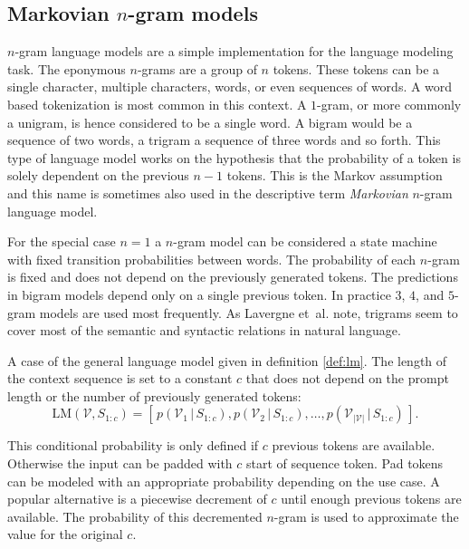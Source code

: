     \subsection{Markovian $n$-gram models}
    $n$-gram language models are a simple implementation for the language modeling task.
    The eponymous $n$-grams are a group of $n$ tokens.
    These tokens can be a single character, multiple characters, words, or even sequences of words.
    A word based tokenization is most common in this context.
    A $1$-gram, or more commonly a unigram, is hence considered to be a single word.
    A bigram would be a sequence of two words, a trigram a sequence of three words and so forth.
    This type of language model works on the hypothesis that the probability of a token is solely dependent on the previous $n-1$ tokens.
    This is the Markov assumption and this name is sometimes also used in the descriptive term \emph{Markovian} $n$-gram language model. 

    For the special case $n=1$ a $n$-gram model can be considered a state machine with fixed transition probabilities between words.
    The probability of each $n$-gram is fixed and does not depend on the previously generated tokens.
    The predictions in bigram models depend only on a single previous token.
    In practice $3$, $4$, and $5$-gram models are used most frequently.
    As Lavergne et~al. \cite{lavergne2008detecting} note, trigrams seem to cover most of the semantic and syntactic relations in natural language.

    \begin{definition}
    \label{def:markovLM}
        A case of the general language model given in definition \ref{def:lm}.
        The length of the context sequence is set to a constant $c$ that does not depend on the prompt length or the number of previously generated tokens:
        \begin{equation}
            \mathrm{LM}(\mathcal{V}, S_{1:c}) = \left[ \, p(\mathcal{V}_1 \, | \, S_{1:c}), p(\mathcal{V}_2 \, | \, S_{1:c}), \dots,  p(\mathcal{V}_{|\mathcal{V}|} \, | \, S_{1:c}) \,  \right] \text{.}
        \end{equation}
    \end{definition}

    This conditional probability is only defined if $c$ previous tokens are available.
    Otherwise the input can be padded with $c$ start of sequence token.
    Pad tokens can be modeled with an appropriate probability depending on the use case.
    A popular alternative is a piecewise decrement of $c$ until enough previous tokens are available.
    The probability of this decremented $n$-gram is used to approximate the value for the original $c$.

